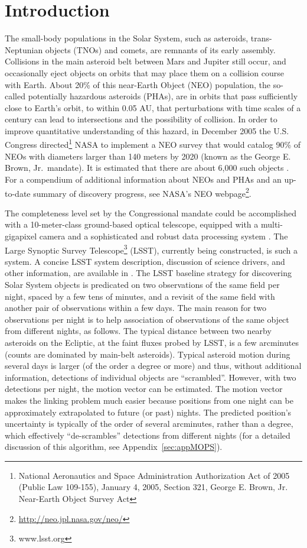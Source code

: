 
\section{Introduction}

The small-body populations in the Solar System, such as asteroids, trans-Neptunian objects (TNOs)
and comets, are remnants of its early assembly. Collisions in the main asteroid belt between Mars and
Jupiter still occur, and occasionally eject objects on orbits that may place them on a collision course
with Earth. About 20\% of this near-Earth Object (NEO) population, the so-called potentially hazardous
asteroids (PHAs), are in orbits that pass sufficiently close to Earth's orbit, to within 0.05 AU, that
perturbations with time scales of a century can lead to intersections and the possibility of collision.
In order to improve quantitative understanding of this hazard, in December 2005 the U.S. Congress
directed\footnote{National Aeronautics and Space Administration Authorization Act of 2005 (Public Law 109-155), January 4, 2005, Section 321, George E. Brown, Jr. Near-Earth Object Survey Act} NASA to implement a NEO survey that
would catalog 90\% of NEOs with diameters larger than 140 meters by 2020 (known as the George
E. Brown, Jr.\ mandate). It is estimated that there are about 6,000 such objects \citep{harris15}.
For a compendium of additional information about NEOs and PHAs and an up-to-date summary of
discovery progress, see NASA's NEO webpage\footnote{\url{http://neo.jpl.nasa.gov/neo/}}.

The completeness level set by the Congressional mandate could be accomplished with a 10-meter-class
ground-based optical telescope, equipped with a multi-gigapixel camera and a sophisticated and robust data
processing system \citep[see NASA-commissioned reports by ][]{stokes03,shapiro10}. The Large Synoptic Survey Telescope\footnote{www.lsst.org} (LSST), currently being
constructed, is such a system. A concise LSST system description, discussion of science drivers, and other
information, are available in \cite{LSSToverview}. The LSST baseline strategy for discovering Solar System
objects is predicated on two observations of the same field per night, spaced by a few tens of minutes, and
a revisit of the same field with another pair of observations within a few days. The main reason for two
observations per night is to help association of observations of the same object from different nights,
as follows. The typical distance between two nearby asteroids on the Ecliptic, at the faint fluxes probed by
LSST, is a few arcminutes (counts are dominated by main-belt asteroids). Typical asteroid motion
during several days is larger (of the order a degree or more) and thus, without additional information,
detections of individual objects are ``scrambled''. However, with two detections per night, the motion
vector can be estimated. The motion vector makes the linking problem much easier because
positions from one night can be approximately extrapolated to future (or past) nights. The predicted
position's uncertainty is typically of the order of several arcminutes, rather than a degree, which effectively
``de-scrambles'' detections from different nights (for a detailed discussion of this algorithm, see
Appendix~\ref{sec:appMOPS}).

